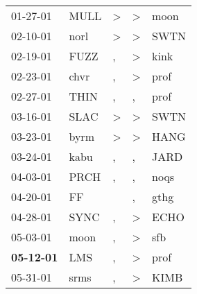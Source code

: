 \begin{supertabular}{p{0.07\textwidth}p{0.06\textwidth}p{0.02\textwidth}p{0.02\textwidth}p{0.06\textwidth}}
          01-27-01\textsuperscript{} &           MULL\textsuperscript{} &     \textgreater &     \textgreater &           moon\textsuperscript{} \\
          02-10-01\textsuperscript{} &           norl\textsuperscript{} &     \textgreater &     \textgreater &           SWTN\textsuperscript{} \\
          02-19-01\textsuperscript{} &           FUZZ\textsuperscript{} &                , &     \textgreater &           kink\textsuperscript{} \\
          02-23-01\textsuperscript{} &           chvr\textsuperscript{} &                , &     \textgreater &           prof\textsuperscript{} \\
          02-27-01\textsuperscript{} &           THIN\textsuperscript{} &                , &                , &           prof\textsuperscript{} \\
          03-16-01\textsuperscript{} &           SLAC\textsuperscript{} &     \textgreater &     \textgreater &           SWTN\textsuperscript{} \\
          03-23-01\textsuperscript{} &           byrm\textsuperscript{} &     \textgreater &     \textgreater &           HANG\textsuperscript{} \\
          03-24-01\textsuperscript{} &           kabu\textsuperscript{} &                , &                , &           JARD\textsuperscript{} \\
          04-03-01\textsuperscript{} &           PRCH\textsuperscript{} &                , &                , &           noqs\textsuperscript{} \\
          04-20-01\textsuperscript{} &             FF\textsuperscript{} &                  &                , &           gthg\textsuperscript{} \\
          04-28-01\textsuperscript{} &           SYNC\textsuperscript{} &                , &     \textgreater &           ECHO\textsuperscript{} \\
          05-03-01\textsuperscript{} &           moon\textsuperscript{} &                , &     \textgreater &            sfb\textsuperscript{} \\
 \textbf{05-12-01\textsuperscript{}} &            LMS\textsuperscript{} &                , &     \textgreater &           prof\textsuperscript{} \\
          05-31-01\textsuperscript{} &           srms\textsuperscript{} &                , &     \textgreater &           KIMB\textsuperscript{} \\

\end{supertabular}
